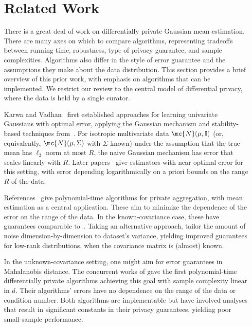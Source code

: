 \section{Related Work}
\label{app:related-work}

There is a great deal of work on differentially private Gaussian mean estimation.
There are many axes on which to compare algorithms, representing tradeoffs between running time, robustness, type of privacy guarantee, and sample complexities.
Algorithms also differ in the style of error guarantee and the assumptions they make about the data distribution.
This section provides a brief overview of this prior work, with emphasis on algorithms that can be implemented. 
We restrict our review to the central model of differential privacy, where the data is held by a single curator.


Karwa and Vadhan~\cite{karwa2017finite} first established approaches for learning univariate Gaussians with optimal error, applying the Gaussian mechanism and stability-based techniques from~\cite{DworkL09}.
For isotropic multivariate data $\mc{N}(\mu,\mathbb{I})$ (or, equivalently, $\mc{N}(\mu,\Sigma)$ with $\Sigma$ known) under the assumption that the true mean has $\ell_2$ norm at most $R$, the naive Gaussian mechanism has error that scales linearly with $R$.
Later papers~\cite{kamath_KLSU19,biswas2020coinpress} give estimators with near-optimal error for this setting, with error depending logarithmically on a priori bounds on the range $R$ of the data.

References~\cite{HuangLY21, tsfadia2022friendlycore} give polynomial-time algorithms for private aggregation, with mean estimation as a central application. 
These 
aim to minimize the dependence of the error on the range of the data. 
In the known-covariance case, these have guarantees comparable to~\cite{biswas2020coinpress}. 
Taking an alternative approach, \cite{aumuller2023plan, dagan2024dimension} tailor the amount of noise dimension-by-dimension to dataset's variance, yielding improved guarantees for low-rank distributions, when the covariance matrix is (almost) known. 

In the unknown-covariance setting, one might aim for error guarantees in Mahalanobis distance.
The concurrent works of \cite{duchi2023fast,brown2023fast} gave the first polynomial-time differentially private algorithms achieving this goal with sample complexity linear in $d$.
Their algorithms' errors have no dependence on the range of the data or condition number.
Both algorithms are implementable but have involved analyses that result in significant constants in their privacy guarantees, yielding poor small-sample performance. 


